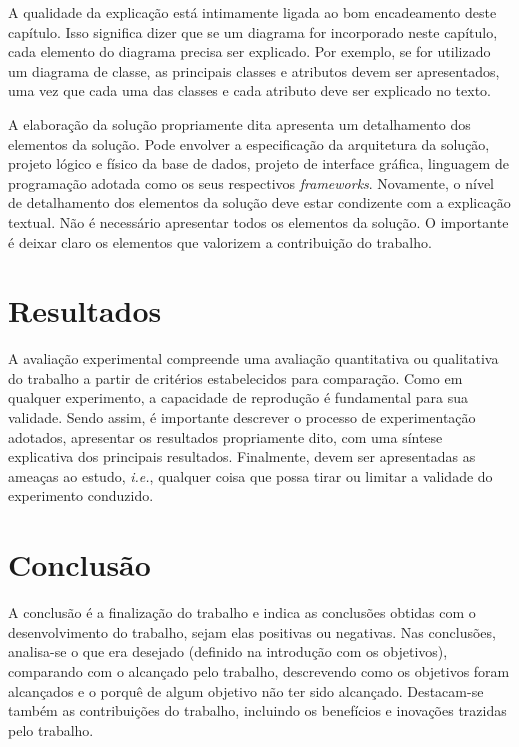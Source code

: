 \documentclass[12pt]{tcc}
\begin{document}
A qualidade da explicação está intimamente ligada ao bom encadeamento deste capítulo. Isso significa dizer que se um diagrama for incorporado neste capítulo, cada elemento do diagrama precisa ser explicado. Por exemplo, se for utilizado um diagrama de classe, as principais classes e atributos devem ser apresentados, uma vez que cada uma das classes e cada atributo deve ser explicado no texto.

A elaboração da solução propriamente dita apresenta um detalhamento dos elementos da solução. Pode envolver a especificação da arquitetura da solução, projeto lógico e físico da base de dados, projeto de interface gráfica, linguagem de programação adotada como os seus respectivos \emph{frameworks}. Novamente, o nível de detalhamento dos elementos da solução deve estar condizente com a explicação textual. Não é necessário apresentar todos os elementos da solução. O importante é deixar claro os elementos que valorizem a contribuição do trabalho.

\chapter{Resultados}
\label{sec:aval_exp}

A avaliação experimental compreende uma avaliação quantitativa ou qualitativa do trabalho a partir de critérios estabelecidos para comparação. Como em qualquer experimento, a capacidade de reprodução é fundamental para sua validade. Sendo assim, é importante descrever o processo de experimentação adotados, apresentar os resultados propriamente dito, com uma síntese explicativa dos principais resultados. Finalmente, devem ser apresentadas as ameaças ao estudo, \emph{i.e.}, qualquer coisa que possa tirar ou limitar a validade do experimento conduzido. 

\chapter{Conclusão}
	\label{sec:conclusao}

	A conclusão é a finalização do trabalho e indica as conclusões obtidas com o desenvolvimento do trabalho, sejam elas positivas ou negativas. Nas conclusões, analisa-se o que era desejado (definido na introdução com os objetivos), comparando com o alcançado pelo trabalho, descrevendo como os objetivos foram alcançados e o porquê de algum objetivo não ter sido alcançado. Destacam-se também as contribuições do trabalho, incluindo os benefícios e inovações trazidas pelo trabalho.
\end{document}
